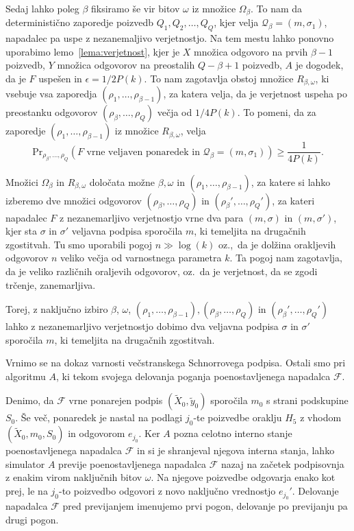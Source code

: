 \documentclass[isrm2, tisk]{fmfdelo}
\begin{document}
\begin{dokaz}
    Sedaj lahko poleg $\beta$ fiksiramo še vir bitov $\omega$ iz množice $\Omega_\beta$. To nam da
    deterministično zaporedje poizvedb $Q_1, Q_2, \dots, Q_Q$, kjer velja $\mathcal{Q}_\beta =
    (m, \sigma_1)$, napadalec pa uspe z nezanemaljivo verjetnostjo. Na tem mestu lahko ponovno
    uporabimo lemo~\ref{lema:verjetnost}, kjer je $X$ množica odgovoro na prvih $\beta - 1$ poizvedb,
    $Y$ množica odgovorov na preostalih $Q - \beta + 1$ poizvedb, $A$ je dogodek, da je $F$ uspešen
    in $\epsilon = 1/2P(k)$. To nam zagotavlja obstoj množice $R_{\beta, \omega}$, ki vsebuje vsa
    zaporedja $(\rho_1, \dots, \rho_{\beta - 1})$, za katera velja, da je verjetnost uspeha po
    preostanku odgovorov $(\rho_\beta, \dots, \rho_Q)$ večja od $1/4P(k)$. To pomeni, da za
    zaporedje $(\rho_1, \dots, \rho_{\beta - 1})$ iz množice $R_{\beta, \omega}$, velja
    $$
    \text{Pr}_{\rho_\beta, \dots, \rho_Q}(\text{$F$ vrne veljaven ponaredek in } \mathcal{Q}_\beta
    = (m, \sigma_1)) \geq \frac{1}{4P(k)}.
    $$

    Množici $\Omega_\beta$ in $R_{\beta, \omega}$ določata možne $\beta, \omega$ in $(\rho_1, \dots,
    \rho_{\beta - 1})$, za katere si lahko izberemo dve množici odgovorov $(\rho_\beta, \dots, \rho_Q)$
    in $(\rho_\beta', \dots, \rho_Q')$, za kateri napadalec $F$ z nezanemarljivo verjetnostjo vrne
    dva para $(m, \sigma)$ in $(m, \sigma')$, kjer sta $\sigma$ in $\sigma'$ veljavna podpisa sporočila
    $m$, ki temeljita na drugačnih zgostitvah. Tu smo uporabili pogoj $n \gg \log(k)$ oz.,\ da je
    dolžina orakljevih odgovorov $n$ veliko večja od varnostnega parametra $k$. Ta pogoj nam zagotavlja,
    da je veliko različnih oraljevih odgovorov, oz.\ da je verjetnost, da se zgodi trčenje,
    zanemarljiva.

    Torej, z naključno izbiro $\beta$, $\omega$, $(\rho_1, \dots, \rho_{\beta - 1}), (\rho_\beta, 
    \dots, \rho_Q)$ in $(\rho_\beta', \dots, \rho_Q')$ lahko z nezanemarljivo verjetnostjo dobimo
    dva veljavna podpisa $\sigma$ in $\sigma'$ sporočila $m$, ki temeljita na drugačnih zgostitvah.
\end{dokaz}

Vrnimo se na dokaz varnosti večstranskega Schnorrovega podpisa. Ostali smo pri algoritmu $A$, ki
tekom svojega delovanja poganja poenostavljenega napadalca $\mathcal{F}$. 

Denimo, da $\mathcal{F}$ vrne ponarejen podpis $(\tilde{X}_0, \tilde{y}_0)$ sporočila $m_0$ s strani
podskupine $S_0$. Še več, ponaredek je nastal na podlagi $j_0$-te poizvedbe oraklju $H_5$ z vhodom
$(\tilde{X}_0, m_0, S_0)$ in odgovorom $e_{j_0}$. Ker $A$ pozna celotno interno stanje poenostavljenega
napadalca $\mathcal{F}$ in si je shranjeval njegova interna stanja, lahko simulator $A$ previje
poenostavljenega napadalca $\mathcal{F}$ nazaj na začetek podpisovnja z enakim virom naključnih bitov
$\omega$. Na njegove poizvedbe odgovarja enako kot prej, le na $j_0$-to poizvedbo odgovori z novo
naključno vrednostjo $e_{j_0}'$. Delovanje napadalca $\mathcal{F}$ pred previjanjem imenujemo prvi
pogon, delovanje po previjanju pa drugi pogon.
\end{document}
